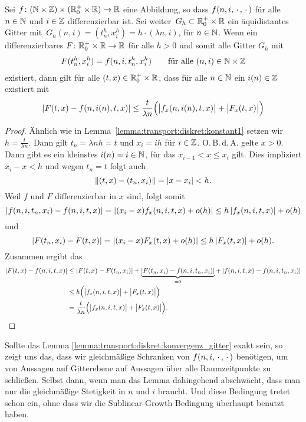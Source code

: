 \begin{lemma}\label{lemma:transport:diskret:konvergenz_gitter}
Sei $f\colon (\mathbb N \times \mathbb Z) \times (\mathbb R^+_0 \times \mathbb R) \to \mathbb R$ eine Abbildung, so dass $f(n,i,\, \cdot \,,\, \cdot \,)$ für alle $n \in \mathbb N$ und $i \in \mathbb Z$ differenzierbar ist.
Sei weiter\, $G_h \subset \mathbb R^+_0 \times \mathbb R$ ein äquidistantes Gitter mit\, $G_h(n,i) = (t^h_n, x^h_i) = h \cdot (\lambda n, i)$, für $n \in \mathbb N$.
Wenn ein differenzierbares $F\colon \mathbb R^+_0 \times \mathbb R \to \mathbb R$ für alle $h > 0$ und somit alle Gitter $G_h$ mit
\begin{align}\label{eq:lemma:diag:voraussetzung}
F(t^h_n, x^h_i) = f(n, i, t^h_n, x^h_i) \qquad \text{für alle $(n,i) \in \mathbb N \times \mathbb Z$}
\end{align}
existiert, dann gilt für alle $(t, x) \in \mathbb R^+_0 \times \mathbb R$, dass für alle $n \in \mathbb N$ ein $i(n) \in \mathbb Z$ existiert mit
\begin{align}\label{eq:lemma:diag:aussage}
\left| F(t, x) - f(n, i(n), t, x) \right| \leq \frac {t}{\lambda n} \Bigl(\bigl\lvert f_x(n, i(n), t, x) \bigr\rvert + \bigl\lvert F_x(t, x) \bigr\rvert \Bigr)
\end{align}
\end{lemma}
\begin{proof}
Ähnlich wie in Lemma~\ref{lemma:transport:diskret:konstant1} setzen wir $h = \frac {t}{\lambda n}$.
Dann gilt $t_n = \lambda n h = t$ und $x_i = i h$ für $i \in \mathbb Z$.
O.\,B.\,d.\,A. gelte $x > 0$.
Dann gibt es ein kleinstes $i(n) = i \in \mathbb N$, für das $x_{i-1} < x \leq x_i$ gilt.
Dies impliziert $x_i - x < h$ und wegen $t_n = t$ folgt auch
\[ \left\lVert (t,x) - (t_n, x_i) \right\rVert = \left| x - x_i \right| < h. \]
Weil $f$ und $F$ differenzierbar in $x$ sind, folgt somit
\[ \left| f(n, i, t_n, x_i) - f(n, i, t, x) \right| = \left| (x_i - x) f_x(n, i, t, x) + o(h) \right| \leq h \left| f_x(n, i, t, x) \right| + o(h) \]
und
\[ \left| F(t_n, x_i) - F(t, x) \right| = \left| (x_i - x) F_x(t, x) + o(h) \right| \leq h \left| F_x(t, x) \right| + o(h). \]
Zusammen ergibt das
{\small
\begin{align*}
\left| F(t,x) - f(n, i, t, x) \right| &\leq \left| F(t, x) - F(t_n, x_i) \right| + \underbrace{\left| F(t_n, x_i) - f(n, i, t_n, x_i) \right|}_{= 0} + \left| f(n,i, t, x) - f(n, i, t_n, x_i) \right|\\
&\leq h \Bigl(\bigl\lvert f_x(n, i, t, x) \bigr\rvert + \bigl\lvert F_x(t, x) \bigr\rvert \Bigr)\\
&= \frac {t}{\lambda n} \Bigl(\bigl\lvert f_x(n, i, t, x) \bigr\rvert + \bigl\lvert F_x(t, x) \bigr\rvert \Bigr). \qedhere
\end{align*}
}
\end{proof}
Sollte das Lemma \ref{lemma:transport:diskret:konvergenz_gitter} exakt sein, so zeigt uns das, dass wir gleichmäßige Schranken von $f(n, i, \, \cdot \,, \, \cdot \,)$ benötigen, um von Aussagen auf Gitterebene auf Aussagen über alle Raumzeitpunkte zu schließen.
Selbst dann, wenn man das Lemma dahingehend abschwächt, dass man nur die gleichmäßige Stetigkeit in $n$ und $i$ braucht.
Und diese Bedingung tretet schon ein, ohne dass wir die Sublinear-Growth Bedingung überhaupt benutzt haben.


